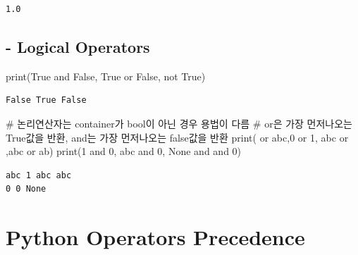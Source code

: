 \documentclass[
  letterpaper,
  DIV=11,
  numbers=noendperiod]{scrreprt}
\newenvironment{Shaded}{\begin{snugshade}}{\end{snugshade}}
\newcommand{\BuiltInTok}[1]{\textcolor[rgb]{0.00,0.23,0.31}{#1}}
\newcommand{\CommentTok}[1]{\textcolor[rgb]{0.37,0.37,0.37}{#1}}
\newcommand{\DecValTok}[1]{\textcolor[rgb]{0.68,0.00,0.00}{#1}}
\newcommand{\KeywordTok}[1]{\textcolor[rgb]{0.00,0.23,0.31}{#1}}
\newcommand{\NormalTok}[1]{\textcolor[rgb]{0.00,0.23,0.31}{#1}}
\newcommand{\StringTok}[1]{\textcolor[rgb]{0.13,0.47,0.30}{#1}}
\newcommand{\VariableTok}[1]{\textcolor[rgb]{0.07,0.07,0.07}{#1}}
\begin{document}
\begin{verbatim}
1.0
\end{verbatim}

\subsection{- Logical Operators}\label{logical-operators}

\begin{Shaded}
\begin{Highlighting}[]
\BuiltInTok{print}\NormalTok{(}\VariableTok{True} \KeywordTok{and} \VariableTok{False}\NormalTok{, }\VariableTok{True} \KeywordTok{or} \VariableTok{False}\NormalTok{, }\KeywordTok{not} \VariableTok{True}\NormalTok{)}
\end{Highlighting}
\end{Shaded}

\begin{verbatim}
False True False
\end{verbatim}

\begin{Shaded}
\begin{Highlighting}[]
\CommentTok{\# 논리연산자는 container가 bool이 아닌 경우 용법이 다름}
\CommentTok{\# or은 가장 먼저나오는 True값을 반환, and는 가장 먼저나오는 false값을 반환}
\BuiltInTok{print}\NormalTok{(}\StringTok{\textquotesingle{}\textquotesingle{}} \KeywordTok{or} \StringTok{\textquotesingle{}abc\textquotesingle{}}\NormalTok{,}\DecValTok{0} \KeywordTok{or} \DecValTok{1}\NormalTok{, }\StringTok{\textquotesingle{}abc\textquotesingle{}} \KeywordTok{or} \StringTok{\textquotesingle{}\textquotesingle{}}\NormalTok{,}\StringTok{\textquotesingle{}abc\textquotesingle{}} \KeywordTok{or} \StringTok{\textquotesingle{}ab\textquotesingle{}}\NormalTok{)}
\BuiltInTok{print}\NormalTok{(}\DecValTok{1} \KeywordTok{and} \DecValTok{0}\NormalTok{, }\StringTok{\textquotesingle{}abc\textquotesingle{}} \KeywordTok{and} \DecValTok{0}\NormalTok{, }\VariableTok{None} \KeywordTok{and} \StringTok{\textquotesingle{}\textquotesingle{}} \KeywordTok{and} \DecValTok{0}\NormalTok{)}
\end{Highlighting}
\end{Shaded}

\begin{verbatim}
abc 1 abc abc
0 0 None
\end{verbatim}

\section{Python Operators Precedence}\label{python-operators-precedence}
\end{document}
